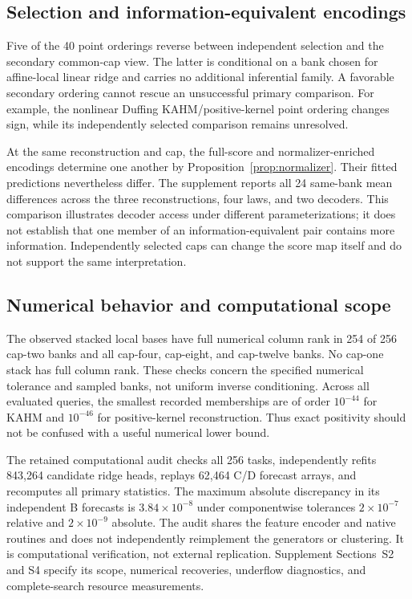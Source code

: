 \subsection{Selection and information-equivalent encodings}
Five of the 40 point orderings reverse between independent selection and the secondary common-cap view. The latter is conditional on a bank chosen for affine-local linear ridge and carries no additional inferential family. A favorable secondary ordering cannot rescue an unsuccessful primary comparison. For example, the nonlinear Duffing KAHM/positive-kernel point ordering changes sign, while its independently selected comparison remains unresolved.

At the same reconstruction and cap, the full-score and normalizer-enriched encodings determine one another by Proposition~\ref{prop:normalizer}. Their fitted predictions nevertheless differ. The supplement reports all 24 same-bank mean differences across the three reconstructions, four laws, and two decoders. This comparison illustrates decoder access under different parameterizations; it does not establish that one member of an information-equivalent pair contains more information. Independently selected caps can change the score map itself and do not support the same interpretation.

\subsection{Numerical behavior and computational scope}
The observed stacked local bases have full numerical column rank in 254 of 256 cap-two banks and all cap-four, cap-eight, and cap-twelve banks. No cap-one stack has full column rank. These checks concern the specified numerical tolerance and sampled banks, not uniform inverse conditioning. Across all evaluated queries, the smallest recorded memberships are of order $10^{-44}$ for KAHM and $10^{-46}$ for positive-kernel reconstruction. Thus exact positivity should not be confused with a useful numerical lower bound.

The retained computational audit checks all 256 tasks, independently refits 843,264 candidate ridge heads, replays 62,464 C/D forecast arrays, and recomputes all primary statistics. The maximum absolute discrepancy in its independent B forecasts is $3.84\times10^{-8}$ under componentwise tolerances $2\times10^{-7}$ relative and $2\times10^{-9}$ absolute. The audit shares the feature encoder and native routines and does not independently reimplement the generators or clustering. It is computational verification, not external replication. Supplement Sections~S2 and S4 specify its scope, numerical recoveries, underflow diagnostics, and complete-search resource measurements.
